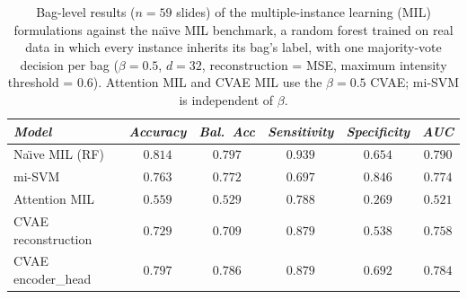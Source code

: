 \documentclass[12pt]{article}
\theoremstyle{paper}
\begin{document}
\begin{table}[H]
\centering
\small
\begin{tabular*}{\textwidth}{@{\extracolsep{\fill}}lccccc}
\toprule
\emph{Model} & \emph{Accuracy} & \emph{Bal.\ Acc} & \emph{Sensitivity} & \emph{Specificity} & \emph{AUC} \\
\midrule
Na\"{\i}ve MIL (RF) & $0.814$ & $0.797$ & $0.939$ & $0.654$ & $0.790$ \\
\midrule
mi-SVM & $0.763$ & $0.772$ & $0.697$ & $0.846$ & $0.774$ \\
Attention MIL & $0.559$ & $0.529$ & $0.788$ & $0.269$ & $0.521$ \\
CVAE reconstruction & $0.729$ & $0.709$ & $0.879$ & $0.538$ & $0.758$ \\
CVAE encoder\_head & $0.797$ & $0.786$ & $0.879$ & $0.692$ & $0.784$ \\
\bottomrule
\end{tabular*}
\caption{\small Bag-level results ($n=59$ slides) of the multiple-instance learning (MIL) formulations against the na\"{\i}ve MIL benchmark, a random forest trained on real data in which every instance inherits its bag's label, with one majority-vote decision per bag ($\beta=0.5$, $d=32$, reconstruction = MSE, maximum intensity threshold = 0.6). Attention MIL and CVAE MIL use the $\beta=0.5$ CVAE; mi-SVM is independent of $\beta$.}
\label{tab:mil_results}
\end{table}
\end{document}
